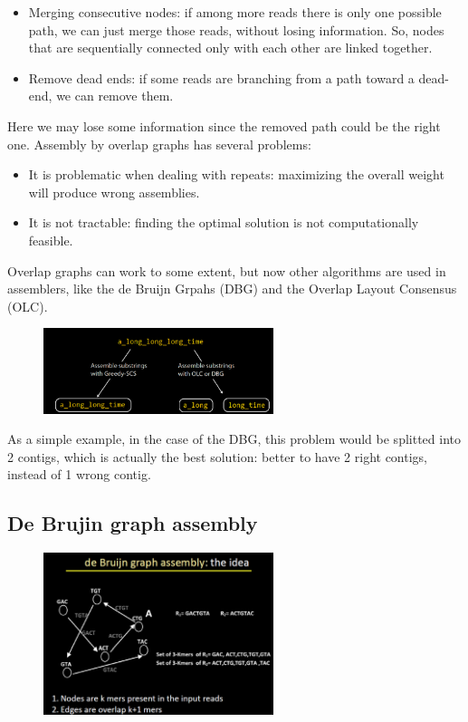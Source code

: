 \begin{itemize}
    \item Merging consecutive nodes: if among more reads there is only one possible path, we can just merge those reads, without losing information. So, nodes that are sequentially connected only with each other are linked together.
    \item  Remove dead ends: if some reads are branching from a path toward a dead-end, we can remove them. 
\end{itemize}
Here we may lose some information since the removed path could be the right one.
Assembly by overlap graphs has several problems:

\begin{itemize}
    \item It is problematic when dealing with repeats: maximizing the overall weight will produce wrong assemblies.
    \item It is not tractable: finding the optimal solution is not computationally feasible.
\end{itemize}

Overlap graphs can work to some extent, but now other algorithms are used in assemblers, like the de Bruijn Grpahs (DBG) and the Overlap Layout Consensus (OLC).

\begin{figure}[h]
\centering
\includegraphics[width=0.6\textwidth]{DBG.png}
\caption{}
\end{figure}

As a simple example, in the case of the DBG, this problem would be splitted into 2 contigs, which is actually the best solution: better to have 2 right contigs, instead of 1 wrong contig.

\subsection{De Brujin graph assembly}

\begin{figure}[h]
\centering
\includegraphics[width=0.6\textwidth]{DBGAssembly.png}
\caption{}
\end{figure}

